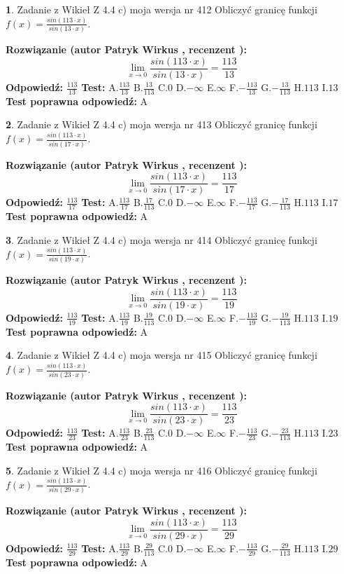 \documentclass[12pt, a4paper]{article}
\theoremstyle{definition} %
\newtheorem{zad}{}
\newcommand{\zadStart}[1]{\begin{zad}#1\newline}
\newcommand{\zadStop}{\end{zad}}
\newcommand{\rozwStart}[2]{\noindent \textbf{Rozwiązanie (autor #1 , recenzent #2): }\newline}
\newcommand{\rozwStop}{\newline}
\newcommand{\odpStart}{\noindent \textbf{Odpowiedź:}\newline}
\newcommand{\odpStop}{\newline}
\newcommand{\testStart}{\noindent \textbf{Test:}\newline}
\newcommand{\testStop}{\newline}
\newcommand{\kluczStart}{\noindent \textbf{Test poprawna odpowiedź:}\newline}
\newcommand{\kluczStop}{\newline}
\begin{document}
\zadStart{Zadanie z Wikieł Z 4.4 c) moja wersja nr 412}
Obliczyć granicę funkcji $f(x)=\frac{sin(113\cdot x)}{sin(13\cdot x)}$.
\zadStop
\rozwStart{Patryk Wirkus}{}
$$\lim\limits_{x\to 0}\frac{sin(113\cdot x)}{sin(13\cdot x)}=
\frac{113}{13}$$
\rozwStop
\odpStart
$\frac{113}{13}$
\odpStop
\testStart
A.$\frac{113}{13}$
B.$\frac{13}{113}$
C.$0$
D.$-\infty$
E.$\infty$
F.$-\frac{113}{13}$
G.$-\frac{13}{113}$
H.$113$
I.$13$
\testStop
\kluczStart
A
\kluczStop



\zadStart{Zadanie z Wikieł Z 4.4 c) moja wersja nr 413}
Obliczyć granicę funkcji $f(x)=\frac{sin(113\cdot x)}{sin(17\cdot x)}$.
\zadStop
\rozwStart{Patryk Wirkus}{}
$$\lim\limits_{x\to 0}\frac{sin(113\cdot x)}{sin(17\cdot x)}=
\frac{113}{17}$$
\rozwStop
\odpStart
$\frac{113}{17}$
\odpStop
\testStart
A.$\frac{113}{17}$
B.$\frac{17}{113}$
C.$0$
D.$-\infty$
E.$\infty$
F.$-\frac{113}{17}$
G.$-\frac{17}{113}$
H.$113$
I.$17$
\testStop
\kluczStart
A
\kluczStop



\zadStart{Zadanie z Wikieł Z 4.4 c) moja wersja nr 414}
Obliczyć granicę funkcji $f(x)=\frac{sin(113\cdot x)}{sin(19\cdot x)}$.
\zadStop
\rozwStart{Patryk Wirkus}{}
$$\lim\limits_{x\to 0}\frac{sin(113\cdot x)}{sin(19\cdot x)}=
\frac{113}{19}$$
\rozwStop
\odpStart
$\frac{113}{19}$
\odpStop
\testStart
A.$\frac{113}{19}$
B.$\frac{19}{113}$
C.$0$
D.$-\infty$
E.$\infty$
F.$-\frac{113}{19}$
G.$-\frac{19}{113}$
H.$113$
I.$19$
\testStop
\kluczStart
A
\kluczStop



\zadStart{Zadanie z Wikieł Z 4.4 c) moja wersja nr 415}
Obliczyć granicę funkcji $f(x)=\frac{sin(113\cdot x)}{sin(23\cdot x)}$.
\zadStop
\rozwStart{Patryk Wirkus}{}
$$\lim\limits_{x\to 0}\frac{sin(113\cdot x)}{sin(23\cdot x)}=
\frac{113}{23}$$
\rozwStop
\odpStart
$\frac{113}{23}$
\odpStop
\testStart
A.$\frac{113}{23}$
B.$\frac{23}{113}$
C.$0$
D.$-\infty$
E.$\infty$
F.$-\frac{113}{23}$
G.$-\frac{23}{113}$
H.$113$
I.$23$
\testStop
\kluczStart
A
\kluczStop



\zadStart{Zadanie z Wikieł Z 4.4 c) moja wersja nr 416}
Obliczyć granicę funkcji $f(x)=\frac{sin(113\cdot x)}{sin(29\cdot x)}$.
\zadStop
\rozwStart{Patryk Wirkus}{}
$$\lim\limits_{x\to 0}\frac{sin(113\cdot x)}{sin(29\cdot x)}=
\frac{113}{29}$$
\rozwStop
\odpStart
$\frac{113}{29}$
\odpStop
\testStart
A.$\frac{113}{29}$
B.$\frac{29}{113}$
C.$0$
D.$-\infty$
E.$\infty$
F.$-\frac{113}{29}$
G.$-\frac{29}{113}$
H.$113$
I.$29$
\testStop
\kluczStart
A
\kluczStop
\end{document}
